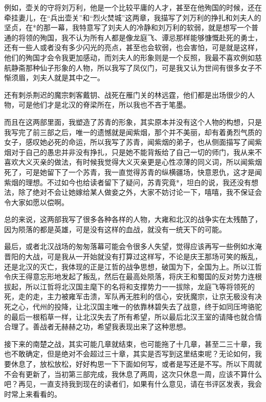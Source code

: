 例如，壶关的守将刘万利，他是一个比较平庸的人才，甚至在他殉国的时候，还在牵挂妻儿，在“兵出壶关”和“烈火焚城”这两章，我描写了刘万利的挣扎和刘夫人的坚贞，在*的那一幕，我特意写了刘夫人的冷静和刘万利的软弱，就是想写一个普通的将领的殉国，我不认为所有人都是像龙庭飞、谭忌那样能够慷慨赴死的勇士，还有一些人或者没有多少闪光的亮点，甚至也会软弱，也会害怕，可是就是这样，他们的殉国才会令我更加感动，而刘夫人的形象则是一个反照，我最不喜欢例如慈航静斋那种仙子形象的人物，所以我写了凤仪门，可是我又认为世间有很多女子不惭须眉，刘夫人就是其中之一。

还有刺杀荆迟的魔宗刺客戴钥、战死在雁门关的林远霆，他们都是出场很少的人物，可是他们才是北汉的脊梁所在，所以我也不吝于笔墨。

而且在这两部里面，我塑造了苏青的形象，其实原本并没有这个人物的构想，只是我写完了前三部之后，唯一的遗憾就是闻紫烟，那个并不美丽，却有着勇烈气质的女子，感叹她必死的命运，所以我写了苏青，闻紫烟的弟子，也从侧面描写了闻紫烟对于自己的愚忠并非没有挣扎，只是她不能背叛给了自己一切的师门，我从来不喜欢大义灭亲的做法，有时候我觉得大义灭亲更是心性凉薄的同义词，所以闻紫烟死了，可是她留下了一个苏青，我一直觉得苏青的纵横疆场，快意恩仇，这才是闻紫烟的理想。不过如今也给读者留下了疑问，苏青究竟*，坦白的说，我还没有想法，除了绝对不会让她嫁给某人做妾之外，大家不妨讨论一下，嘻嘻，我不保证会令大家如愿以偿啊。

总的来说，这两部我写了很多各种各样的人物，大雍和北汉的战争实在太残酷了，因为陨落的都是英雄，可是没有这样的血战，就没有一统天下的可能。

最后，或者北汉战场的匆匆落幕可能会令很多人失望，觉得应该再写一些例如水淹晋阳的大战，可是我从一开始就没有打算过这样写，不论是庆王那场可笑的叛乱，还是北汉的灭亡，我体现的正是江哲的战争思想，破国为下，全国为上。所以江哲令庆王得意忘形地发起了叛乱，然后在最高处陨落，将庆王和蜀国的反对势力连根拔起，所以江哲将北汉国主麾下的名将和支撑势力一一拔除，龙庭飞等将领死的死，走的走，主力被雍军击溃，军队再无胜利的信心，安抚魔宗，让京无极没有决死之心，代州的投降，让北汉国主唯一的依靠林碧失去了战意，终于如同压垮骆驼的最后一根稻草一样，让北汉失去了所有希望，所以最后北汉王室的请降也就合情合理了。善战者无赫赫之功，希望我表现出来了这种思想。

接下来的南楚之战，其实可能几章就结束，也可能拖了十几章，甚至二三十章，我也不敢确定，但是绝对不会超过三十章，其实是否写到这里结束呢？无论如何，我要休息了，放松放松，好好构思一下下面如何写，或者是写还是不写。所以下周就不会有更新了，当初第三部完成，我休息了两周，这次只休息一周，应该不算什么吧？再见，一直支持我到现在的读者们，如果有什么意见，请在书评区发表，我会时常上来看看的。
